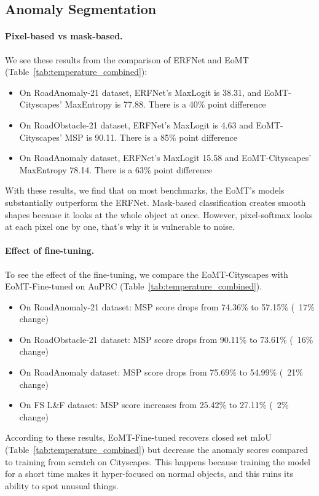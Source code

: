 \subsection{Anomaly Segmentation}

\paragraph{Pixel-based vs mask-based.}

We see these results from the comparison of ERFNet and EoMT (Table~\ref{tab:temperature_combined}):
\begin{itemize}
    \item On RoadAnomaly-21 dataset, ERFNet's MaxLogit is 38.31, and EoMT-Cityscapes' MaxEntropy is 77.88. There is a 40\% point difference
    \item On RoadObstacle-21 dataset, ERFNet's MaxLogit is 4.63 and EoMT-Cityscapes' MSP is 90.11. There is a 85\% point difference
    \item On RoadAnomaly dataset, ERFNet's MaxLogit 15.58 and EoMT-Cityscapes' MaxEntropy 78.14. There is a 63\% point difference
\end{itemize}
With these results, we find that on most benchmarks, the EoMT's models substantially outperform the ERFNet. Mask-based classification 
creates smooth shapes because it looks at the whole object at once. However, pixel-softmax looks at each pixel one by one, that's why it is vulnerable to noise.

\paragraph{Effect of fine-tuning.}

To see the effect of the fine-tuning, we compare the EoMT-Cityscapes with EoMT-Fine-tuned on AuPRC (Table~\ref{tab:temperature_combined}).
\begin{itemize}
    \item On RoadAnomaly-21 dataset: MSP score drops from 74.36\% to 57.15\% (~17\% change)
    \item On RoadObstacle-21 dataset: MSP score drops from 90.11\% to 73.61\% (~16\% change)
    \item On RoadAnomaly dataset: MSP score drops from 75.69\% to 54.99\% (~21\% change)
    \item On FS L\&F dataset: MSP score increases from 25.42\% to 27.11\% (~2\% change)
\end{itemize}
According to these results, EoMT-Fine-tuned recovers closed set mIoU (Table~\ref{tab:temperature_combined}) but decrease the anomaly scores compared to training from scratch on Cityscapes.
This happens because training the model for a short time makes it hyper-focused on normal objects, and this ruins its ability to spot unusual things. 

